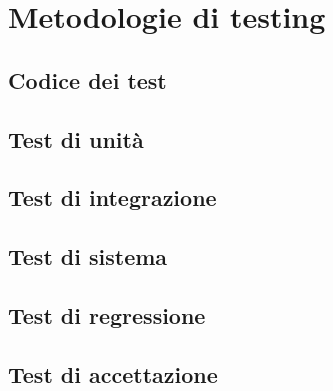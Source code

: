 \section{Metodologie di testing}
\subsection{Codice dei test}
\subsection{Test di unità}
\subsection{Test di integrazione}
\subsection{Test di sistema}
\subsection{Test di regressione}
\subsection{Test di accettazione}